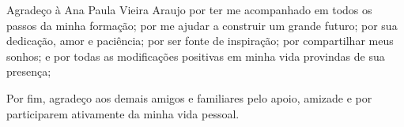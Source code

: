 \begin{agradecimentos}
%

Agradeço à Ana Paula Vieira Araujo por ter me acompanhado em todos os passos da minha formação; por me ajudar a construir um grande futuro; por sua dedicação, amor e paciência; por ser fonte de inspiração; por compartilhar meus sonhos; e por todas as modificações positivas em minha vida provindas de sua presença;

%

Por fim, agradeço aos demais amigos e familiares pelo apoio, amizade e por participarem ativamente da minha vida pessoal.

\end{agradecimentos}